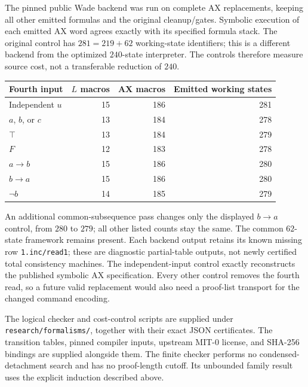 The pinned public Wade backend was run on complete AX replacements, keeping
all other emitted formulas and the original cleanup/gates. Symbolic execution
of each emitted AX word agrees exactly with its specified formula stack.
The original control has $281=219+62$ working-state identifiers; this is a
different backend from the optimized $240$-state interpreter. The controls
therefore measure source cost, not a transferable reduction of $240$.

\begin{center}
\begin{tabular}{lrrr}
Fourth input & $L$ macros & AX macros & Emitted working states\\\hline
Independent $u$ &15&186&281\\
$a$, $b$, or $c$ &13&184&278\\
$\top$ &13&184&279\\
$F$ &12&183&278\\
$a\to b$ &15&186&280\\
$b\to a$ &15&186&280\\
$\neg b$ &14&185&279
\end{tabular}
\end{center}

An additional common-subsequence pass changes only the displayed
$b\to a$ control, from $280$ to $279$; all other listed counts stay the
same. The common $62$-state framework remains present. Each backend output
retains its known missing row \texttt{1.inc/read1}; these are diagnostic
partial-table outputs, not newly certified total consistency machines.
The independent-input control exactly reconstructs the published symbolic
AX specification. Every other control removes the fourth read, so a future
valid replacement would also need a proof-list transport for the changed
command encoding.

The logical checker and cost-control scripts are supplied under
\texttt{research/formalisms/}, together with their exact JSON certificates.
The transition tables, pinned compiler inputs, upstream MIT-0 license, and
SHA-256 bindings are supplied alongside them. The finite checker performs
no condensed-detachment search and has no proof-length cutoff. Its
unbounded family result uses the explicit induction described above.
